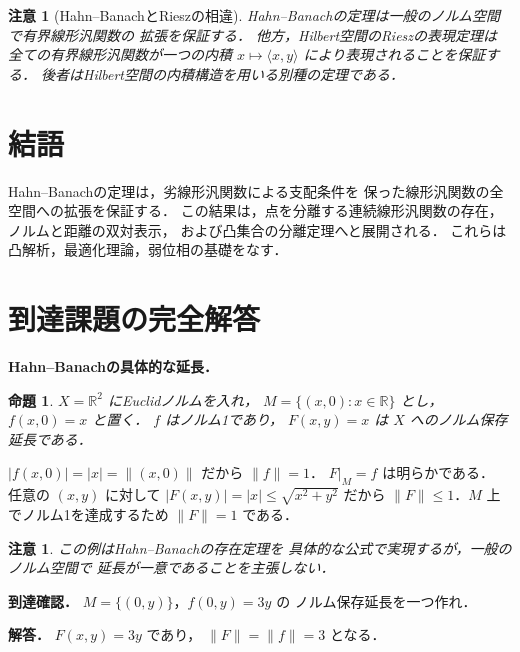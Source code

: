 \documentclass[a5paper,10pt,onecolumn]{jsarticle}
\makeatletter
\theoremstyle{mathnotetheorem}
\newtheorem{proposition}[theorem]{命題}
\newtheorem{remark}[theorem]{注意}
\renewcommand{\proofname}{証明}
\renewenvironment{proof}[1][\proofname]{%
  \par\pushQED{\qed}\normalfont\topsep4\p@\@plus2\p@\relax
  \trivlist\item[\hskip\labelsep\bfseries #1]\ignorespaces
}{\popQED\endtrivlist\@endpefalse}
\makeatother
\begin{document}
\begin{remark}[Hahn--BanachとRieszの相違]
Hahn--Banachの定理は一般のノルム空間で有界線形汎関数の
\emph{拡張}を保証する．
他方，Hilbert空間のRieszの表現定理は
全ての有界線形汎関数が一つの内積
$x\mapsto\langle x,y\rangle$ により\emph{表現}されることを保証する．
後者はHilbert空間の内積構造を用いる別種の定理である．
\end{remark}

\section{結語}
Hahn--Banachの定理は，劣線形汎関数による支配条件を
保った線形汎関数の全空間への拡張を保証する．
この結果は，点を分離する連続線形汎関数の存在，
ノルムと距離の双対表示，
および凸集合の分離定理へと展開される．
これらは凸解析，最適化理論，弱位相の基礎をなす．

\section{到達課題の完全解答}
\noindent\textbf{Hahn--Banachの具体的な延長．}
\begin{proposition}
$X=\mathbb R^2$ にEuclidノルムを入れ，
$M=\{(x,0):x\in\mathbb R\}$ とし，
$f(x,0)=x$ と置く．
$f$ はノルム1であり，
$F(x,y)=x$ は $X$ へのノルム保存延長である．
\end{proposition}
\begin{proof}
$|f(x,0)|=|x|=\|(x,0)\|$ だから $\|f\|=1$．
$F|_M=f$ は明らかである．
任意の $(x,y)$ に対して
$|F(x,y)|=|x|\le\sqrt{x^2+y^2}$ だから
$\|F\|\le1$．$M$ 上でノルム1を達成するため
$\|F\|=1$ である．
\end{proof}
\begin{remark}
この例はHahn--Banachの存在定理を
具体的な公式で実現するが，一般のノルム空間で
延長が一意であることを主張しない．
\end{remark}
\noindent\textbf{到達確認．}
$M=\{(0,y)\}$，$f(0,y)=3y$ の
ノルム保存延長を一つ作れ．
\par\noindent\textbf{解答．}
$F(x,y)=3y$ であり，
$\|F\|=\|f\|=3$ となる．
\end{document}
